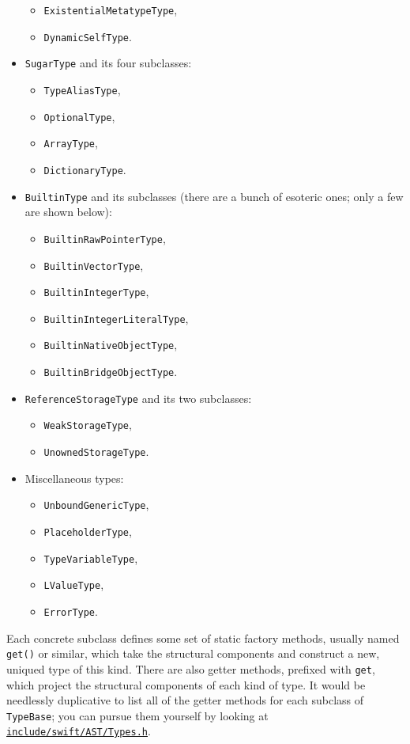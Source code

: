 \documentclass[a4paper,headsepline,bibliography=totoc,toc=flat,fleqn,twoside=semi]{scrbook}
\theoremstyle{definition}
\theoremstyle{definition}
\theoremstyle{definition}
\newcommand{\SourceFile}[1]{\href{https://github.com/apple/swift/tree/main/#1}{\texttt{#1}}}
\begin{document}
\begin{itemize}
\begin{itemize}
\item \texttt{ExistentialMetatypeType},
\item \texttt{DynamicSelfType}.
\end{itemize}
\item \texttt{SugarType} and its four subclasses:
\begin{itemize}
\item \texttt{TypeAliasType},
\item \texttt{OptionalType},
\item \texttt{ArrayType},
\item \texttt{DictionaryType}.
\end{itemize}
\item \texttt{BuiltinType} and its subclasses (there are a bunch of esoteric ones; only a few are shown below):
\begin{itemize}
\item \texttt{BuiltinRawPointerType},
\item \texttt{BuiltinVectorType},
\item \texttt{BuiltinIntegerType},
\item \texttt{BuiltinIntegerLiteralType},
\item \texttt{BuiltinNativeObjectType},
\item \texttt{BuiltinBridgeObjectType}.
\end{itemize}
\item \texttt{ReferenceStorageType} and its two subclasses:
\begin{itemize}
\item \texttt{WeakStorageType},
\item \texttt{UnownedStorageType}.
\end{itemize}
\item Miscellaneous types:
\begin{itemize}
\item \texttt{UnboundGenericType},
\item \texttt{PlaceholderType},
\item \texttt{TypeVariableType},
\item \texttt{LValueType},
\item \texttt{ErrorType}.
\end{itemize}
\end{itemize}
Each concrete subclass defines some set of static factory methods, usually named \texttt{get()} or similar, which take the structural components and construct a new, uniqued type of this kind. There are also getter methods, prefixed with \texttt{get}, which project the structural components of each kind of type. It would be needlessly duplicative to list all of the getter methods for each subclass of \texttt{TypeBase}; you can pursue them yourself by looking at \SourceFile{include/swift/AST/Types.h}.
\end{document}
